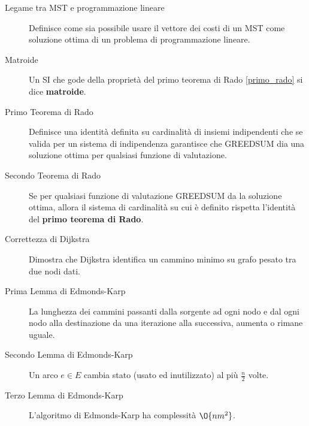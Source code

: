 \documentclass[\main/main.tex]{subfiles}
\begin{document}
\begin{multicols}{2}
\begin{description}
		\item[Legame tra MST e programmazione lineare] Definisce come sia possibile usare il vettore dei costi di un MST come soluzione ottima di un problema di programmazione lineare.
		\item[Matroide] Un SI che gode della proprietà del primo teorema di Rado \ref{primo_rado} si dice \textbf{matroide}.
		\item[Primo Teorema di Rado] Definisce una identità definita su cardinalità di insiemi indipendenti che se valida per un sistema di indipendenza garantisce che GREEDSUM dia una soluzione ottima per qualsiasi funzione di valutazione.
		\item[Secondo Teorema di Rado] Se per qualsiasi funzione di valutazione GREEDSUM da la soluzione ottima, allora il sistema di cardinalità su cui è definito rispetta l'identità del \textbf{primo teorema di Rado}.
		\item[Correttezza di Dijkstra] Dimostra che Dijkstra identifica un cammino minimo su grafo pesato tra due nodi dati.
		\item[Prima Lemma di Edmonds-Karp] La lunghezza dei cammini passanti dalla sorgente ad ogni nodo e dal ogni nodo alla destinazione da una iterazione alla successiva, aumenta o rimane uguale.
		\item[Secondo Lemma di Edmonds-Karp] Un arco \(e \in E\) cambia stato (usato ed inutilizzato) al più \(\frac{n}{2}\) volte.
		\item[Terzo Lemma di Edmonds-Karp] L'algoritmo di Edmonds-Karp ha complessità \(\O{nm^2}\).
	\end{description}
\end{multicols}
\end{document}
